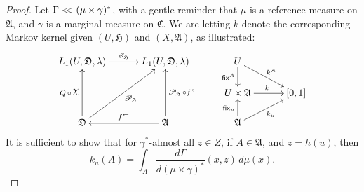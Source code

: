 \documentclass[
twoside=true,
paper=letter,
fontsize=9pt,
pagesize=auto,
leqno,
openany,
headsepline,
overfullrule,
]{scrbook}
\theoremstyle{plain}
\theoremstyle{plain}
\theoremstyle{definition}
\theoremstyle{bfnoteitalic}
\theoremstyle{bfnoteroman}
\newcommand{\sigalg}[1]{\mathfrak{#1}}
\newcommand{\cali}[1]{\mathscr{#1}}
\newcommand{\sfop}[1]{\mathsf{#1}}
\newcommand{\condexpop}[1]{\mathop{\cali{E}\hspace{-1pt}}\nolimits_{#1}}
\newcommand{\condprobop}[1]{\mathop{\cali{P}\hspace{-1pt}}\nolimits_{#1}}
\newcommand{\charfunction}[1]{{\raisebox{2pt}{$\chi$}}_{#1}}
\newcommand{\preimage}[1]{#1^{\leftarrow}}
\newcommand{\sigmaalgebra}{\sigalg{A}}
\newcommand{\sigmaalgebraiii}{\sigalg{C}}
\newcommand{\funch}{h}
\newcommand{\funck}{k}
\newcommand{\function}{f}
\newcommand{\measurespace}{X}
\newcommand{\measurespaceiii}{Z}
\newcommand{\mspaceelt}{x}
\newcommand{\mspaceeltiii}{z}
\newcommand{\abscont}{\mathrel{< \kern-3.5pt <}}
\newcommand{\measure}{\mu}
\newcommand{\measmu}{\mu}
\newcommand{\measureiii}{\lambda}
\newcommand{\seti}{A}
\newcommand{\fixinthefirst}[1]{\sfop{fix}_{#1}}
\newcommand{\fixinthesecond}[1]{\sfop{fix}^{#1}}
\newcommand{\uspace}{U}%
\newcommand{\uspaceelt}{u}
\newcommand{\uspacesig}{\sigalg{D}}
\newcommand{\measonprod}{\Gamma}%
\newcommand{\marginalthree}{\gamma}
\begin{document}
\begin{proof}
Let
$\measonprod\abscont (\measmu\times\marginalthree)^*$, with a gentle reminder that $\measmu$ is a reference measure on $\sigmaalgebra$, and $\marginalthree$ is a marginal measure on
$\sigmaalgebraiii$.
We are letting
$\funck$
denote the corresponding Markov kernel given
$(\uspace,\sigalg{H})$ and $(\measurespace,\sigmaalgebra)$, as illustrated:
\[
\xymatrix@R=16pt@C=30pt{
L_1(\uspace, \uspacesig, \measureiii) \ar[r]^{\condexpop{\sigalg{H}}}
& L_1(\uspace, \uspacesig, \measureiii)
& \uspace
\ar[d]_-{\fixinthesecond{\seti}}
\ar[dr]^{\funck^\seti}
\\
&
& \uspace\times\sigmaalgebra \ar[r]^{\funck}
& [0,1]
\\
\uspacesig
\ar[uu]^{Q\,\circ\,\charfunction{}}
\ar[uur]_{\condprobop{\sigalg{H}}}
& \sigmaalgebra
\ar[uu]_{\condprobop{\sigalg{H}}\circ \preimage{\function}}
\ar[l]_{\preimage{\function}}
& \sigmaalgebra
\ar[u]^{\fixinthefirst{\uspaceelt}}
\ar[ur]_{\funck_\uspaceelt}
&
\\
}
\]
It is sufficient to show that
for $\marginalthree^*$\hyp{}almost all $\mspaceeltiii\in\measurespaceiii$,
if $\seti\in\sigmaalgebra$, and
$\mspaceeltiii = \funch(\uspaceelt)$,
then
\[
\funck_\uspaceelt(\seti)
=
\int_\seti
\frac{d\measonprod}{d(\measure\times\marginalthree)^*}
( \mspaceelt, \mspaceeltiii )
\,d\measmu(\mspaceelt).
\]


\end{proof}
\end{document}
